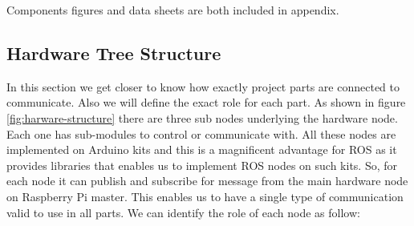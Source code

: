 \documentclass[12pt]{article}
\begin{document}
\noindent Components figures and data sheets are both included in appendix.

\newpage

\subsection{Hardware Tree Structure}
In this section we get closer to know how exactly project parts are connected to communicate. Also we will define the exact role for each part. As shown in figure \ref{fig:harware-structure} there are three sub nodes underlying the hardware node. Each one has sub-modules to control or communicate with. All these nodes are implemented on Arduino kits and this is a magnificent advantage for ROS as it provides libraries that enables us to implement ROS nodes on such kits.\cite{205} So, for each node it can publish and subscribe for message from the main hardware node on Raspberry Pi master. This enables us to have a single type of communication valid to use in all parts. We can identify the role of each node as follow:
\end{document}
